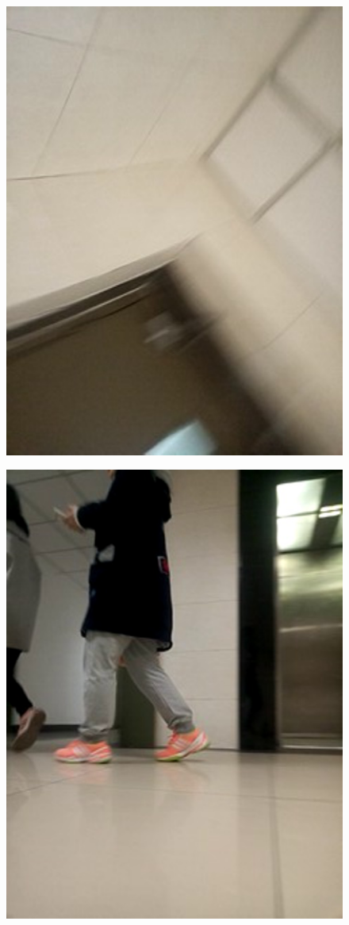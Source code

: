 \documentclass[19pt,a4paper]{article}
\begin{document}
\begin{figure}[H]
 \centering
 \includegraphics[scale=0.4]{3.png}
\end{figure}
\begin{figure}[H]
 \centering
 \includegraphics[scale=0.4]{4.png}
\end{figure}
\end{document}

